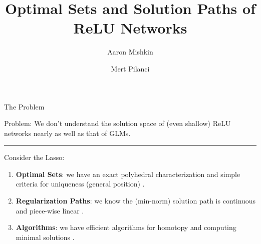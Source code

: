 \documentclass[usenames,dvipsnames,mathserif,notheorems]{beamer}
\title{Optimal Sets and Solution Paths of ReLU Networks}
\author{Aaron Mishkin \and Mert Pilanci}
\institute{ICML 2023}
\date{}
\newcommand{\horizontalrule}{
	{
			\vspace{-0.5em}
			\center \rule{\textwidth}{0.1em}
			\vspace{-0.2em}
		}
}
\newcommand{\bad}[1]{\textcolor{bad}{#1}}
\newcommand{\good}[1]{\textcolor{good}{#1}}
\begin{document}
\maketitle

\begin{frame}{The Problem}

	{
		\large \bad{Problem}: We don't understand the solution space of
		(even shallow) ReLU networks nearly as well as that of \good{GLMs}.
	}

	\pause
	\vspace{0.5em}
	\horizontalrule
	\vspace{0.5em}

	{
		\large
		Consider the Lasso:
	}

	\pause
	\vspace{0.5em}

	\begin{enumerate}
        \item \textbf{Optimal Sets}: we have an exact \good{polyhedral
            characterization} and simple criteria for \good{uniqueness}
            (general position) \citep{tibshirani2013unique}.\pause

        \item \textbf{Regularization Paths}: we know the (min-norm) solution
            path is \good{continuous} and \good{piece-wise linear}
            \citep{osborne2000new}.

        \item \textbf{Algorithms}: we have efficient algorithms for
            \good{homotopy} \citep{efron2004least} and computing \good{minimal
            solutions} \citep{tibshirani2013unique}.
	\end{enumerate}

\end{frame}
\end{document}
